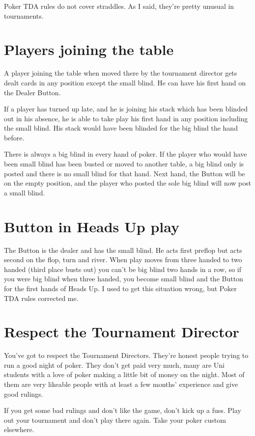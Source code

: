 Poker TDA rules do not cover straddles. As I said, they're pretty
unusual in tournaments.

\section{Players joining the table}

A player joining the table when moved there by the tournament director
gets dealt cards in any position except the small blind. 
He can have his first hand on the Dealer Button.

If a player has turned up late, and he is joining his stack which has been
blinded out in his absence, he is able to take play his first hand in
any position including the small blind. His stack would have been blinded 
for the big blind the hand before.

There is always a big blind in every hand of poker. If the player who
would have been small blind has been busted or moved to another table,
a big blind only is posted and there is no small blind for that hand.
Next hand, the Button will be on the empty position, and the player
who posted the sole big blind will now post a small blind.

\section{Button in Heads Up play}

The Button is the dealer and has the small blind. He acts first preflop
but acts second on the flop, turn and river. When play moves from
three handed to two handed (third place busts out) you can't be big blind
two hands in a row, so if you were big blind when three handed, you become
small blind and the Button for the first hands of Heads Up. I used to
get this situation wrong, but Poker TDA rules corrected me.

\section{Respect the Tournament Director}

You've got to respect the Tournament Directors. They're honest
people trying to run a good night of poker. They don't get paid very much,
many are Uni students with a love of poker making a little bit of money
on the night. Most of them are very likeable people with at least a 
few months' experience and give good rulings.

If you get some bad rulings and don't like the game, don't kick up a fuss.
Play out your tournament and don't play there again. Take your poker
custom elsewhere.

